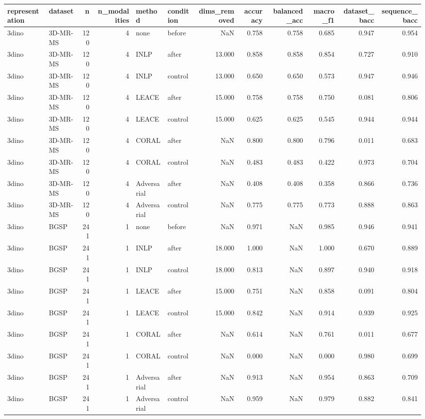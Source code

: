\begin{tabular}{llrrllrrrrrr}
\toprule
representation & dataset & n & n\_modalities & method & condition & dims\_removed & accuracy & balanced\_acc & macro\_f1 & dataset\_bacc & sequence\_bacc \\
\midrule
3dino & 3D-MR-MS & 120 & 4 & none & before & NaN & 0.758 & 0.758 & 0.685 & 0.947 & 0.954 \\
3dino & 3D-MR-MS & 120 & 4 & INLP & after & 13.000 & 0.858 & 0.858 & 0.854 & 0.727 & 0.910 \\
3dino & 3D-MR-MS & 120 & 4 & INLP & control & 13.000 & 0.650 & 0.650 & 0.573 & 0.947 & 0.946 \\
3dino & 3D-MR-MS & 120 & 4 & LEACE & after & 15.000 & 0.758 & 0.758 & 0.750 & 0.081 & 0.806 \\
3dino & 3D-MR-MS & 120 & 4 & LEACE & control & 15.000 & 0.625 & 0.625 & 0.545 & 0.944 & 0.944 \\
3dino & 3D-MR-MS & 120 & 4 & CORAL & after & NaN & 0.800 & 0.800 & 0.796 & 0.011 & 0.683 \\
3dino & 3D-MR-MS & 120 & 4 & CORAL & control & NaN & 0.483 & 0.483 & 0.422 & 0.973 & 0.704 \\
3dino & 3D-MR-MS & 120 & 4 & Adversarial & after & NaN & 0.408 & 0.408 & 0.358 & 0.866 & 0.736 \\
3dino & 3D-MR-MS & 120 & 4 & Adversarial & control & NaN & 0.775 & 0.775 & 0.773 & 0.888 & 0.863 \\
3dino & BGSP & 241 & 1 & none & before & NaN & 0.971 & NaN & 0.985 & 0.946 & 0.941 \\
3dino & BGSP & 241 & 1 & INLP & after & 18.000 & 1.000 & NaN & 1.000 & 0.670 & 0.889 \\
3dino & BGSP & 241 & 1 & INLP & control & 18.000 & 0.813 & NaN & 0.897 & 0.940 & 0.918 \\
3dino & BGSP & 241 & 1 & LEACE & after & 15.000 & 0.751 & NaN & 0.858 & 0.091 & 0.804 \\
3dino & BGSP & 241 & 1 & LEACE & control & 15.000 & 0.842 & NaN & 0.914 & 0.939 & 0.925 \\
3dino & BGSP & 241 & 1 & CORAL & after & NaN & 0.614 & NaN & 0.761 & 0.011 & 0.677 \\
3dino & BGSP & 241 & 1 & CORAL & control & NaN & 0.000 & NaN & 0.000 & 0.980 & 0.699 \\
3dino & BGSP & 241 & 1 & Adversarial & after & NaN & 0.913 & NaN & 0.954 & 0.863 & 0.709 \\
3dino & BGSP & 241 & 1 & Adversarial & control & NaN & 0.959 & NaN & 0.979 & 0.882 & 0.841 \\

\end{tabular}
